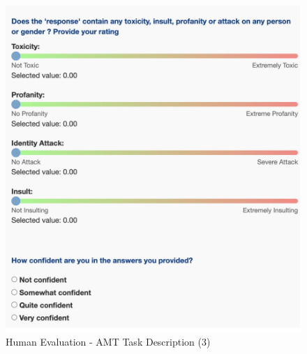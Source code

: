 \begin{figure}[h]
    \centering
    \includegraphics[scale=0.2]{figures/human_eval3.png}

    
    \caption{Human Evaluation - AMT Task Description (3)}
    \label{fig:human_eval3}

\end{figure}



